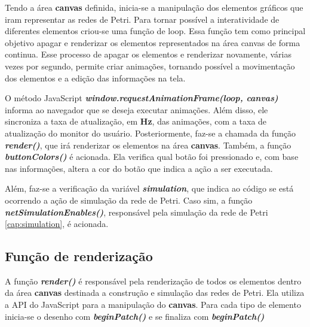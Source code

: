 \documentclass[
	12pt,				%
	openright,			%
	oneside,			%
	a4paper,			%
	english,			%
	brazil				%
	]{abntex2}
\begin{document}
Tendo a área \textbf{canvas} definida, inicia-se a manipulação dos elementos gráficos que iram representar as redes de Petri. Para tornar possível a interatividade de diferentes elementos criou-se uma função de loop. Essa função tem como principal objetivo apagar e renderizar os elementos representados na área canvas de forma continua. Esse processo de apagar os elementos e renderizar novamente, várias vezes por segundo, permite criar animações, tornando possível a movimentação dos elementos e a edição das informações na tela. 



O método JavaScript \textbf{\textit{window.requestAnimationFrame(loop, canvas)}} informa ao navegador que se deseja executar animações. Além disso, ele sincroniza a taxa de atualização, em \textbf{Hz}, das animações, com a taxa de atualização do monitor do usuário. Posteriormente, faz-se a chamada da função \textbf{\textit{render()}}, que irá renderizar os elementos na área \textbf{canvas}. Também, a função \textbf{\textit{buttonColors()}} é acionada. Ela verifica qual botão foi pressionado e, com base nas informações, altera a cor do botão que indica a ação a ser executada. 

Além, faz-se a verificação da variável \textbf{\textit{simulation}}, que indica ao código se está ocorrendo a ação de simulação da rede de Petri. Caso sim, a função \textbf{\textit{netSimulationEnables()}}, responsável pela simulação da rede de Petri \ref{cap:simulation}, é acionada.

\subsection*{Função de renderização}

A função \textbf{\textit{render()}} é responsável pela renderização de todos os elementos dentro da área \textbf{canvas} destinada a construção e simulação das redes de Petri. Ela utiliza a API do JavaScript para a manipulação do \textbf{canvas}. Para cada tipo de elemento inicia-se o desenho com \textbf{\textit{beginPatch()}} e se finaliza com \textbf{\textit{beginPatch()}}
\end{document}
